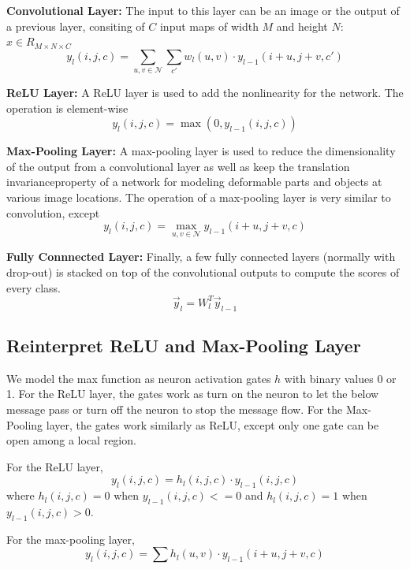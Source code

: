 \textbf{Convolutional Layer:} The input to this layer can be an image or the output of a previous layer, consiting of $C$ input maps of width $M$ and height $N$: $x \in R_{M \times N \times C}$
\begin{equation}
y_l(i,j,c) = \sum_{u,v \in \mathcal{N}}\sum_{c'} w_{l}(u,v) \cdot y_{l-1}(i+u, j+v, c')
\end{equation}

\textbf{ReLU Layer:}
A ReLU layer is used to add the nonlinearity for the network. The operation is element-wise
\begin{equation}
y_l(i,j,c) = \max (0,y_{l-1}(i,j,c))
\end{equation} 

\textbf{Max-Pooling Layer:}
A max-pooling layer is used to reduce the dimensionality of the output from a convolutional layer as well as keep the translation invarianceproperty of a network for modeling deformable parts and objects at various image locations. The operation of a max-pooling layer is very similar to convolution, except  
\begin{equation}
y_l(i,j,c) = \max_{u,v \in \mathcal{N}} y_{l-1}(i+u, j+v, c)
\end{equation}

\textbf{Fully Connnected Layer:}
Finally, a few fully connected layers (normally with drop-out) is stacked on top of the convolutional outputs to compute the scores of every class. 
\begin{equation}
\vec{y}_l = W_l^T  \vec{y}_{l-1}
\end{equation}

\subsection{Reinterpret ReLU and Max-Pooling Layer}
We model the max function as neuron activation gates $h$ with binary values 0 or 1. For the ReLU layer, the gates work as turn on the neuron to let the below message pass or turn off the neuron to stop the message flow. For the Max-Pooling layer, the gates work similarly as ReLU, except only one gate can be open among a local region.

For the ReLU layer, 
\begin{equation}
y_l(i,j,c) = h_l(i,j,c) \cdot y_{l-1}(i,j,c)
\end{equation} 
where $h_l(i,j,c) = 0$ when $y_{l-1}(i,j,c) <= 0$ and $h_l(i,j,c) = 1$ when $y_{l-1}(i,j,c) > 0$.

For the max-pooling layer,
\begin{equation}
y_l(i,j,c) = \sum_{} h_l(u, v) \cdot y_{l-1}(i+u, j+v, c)
\end{equation}

